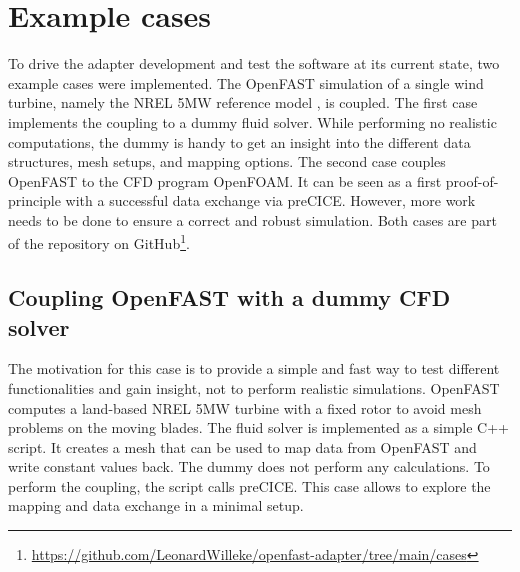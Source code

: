 \section{Example cases}
\label{section:cases}

To drive the adapter development and test the software at its current state, two example cases were implemented. The OpenFAST simulation of a single wind turbine, namely the NREL 5MW reference model \cite{Jonkman:2009}, is coupled. The first case implements the coupling to a dummy fluid solver. While performing no realistic computations, the dummy is handy to get an insight into the different data structures, mesh setups, and mapping options. The second case couples OpenFAST to the CFD program OpenFOAM. It can be seen as a first proof-of-principle with a successful data exchange via preCICE. However, more work needs to be done to ensure a correct and robust simulation. Both cases are part of the repository on GitHub\footnote{\url{https://github.com/LeonardWilleke/openfast-adapter/tree/main/cases}}.

\subsection{Coupling OpenFAST with a dummy CFD solver}
\label{section:cases:dummy}

The motivation for this case is to provide a simple and fast way to test different functionalities and gain insight, not to perform realistic simulations. OpenFAST computes a land-based NREL 5MW turbine with a fixed rotor to avoid mesh problems on the moving blades. The fluid solver is implemented as a simple C++ script. It creates a mesh that can be used to map data from OpenFAST and write constant values back. The dummy does not perform any calculations. To perform the coupling, the script calls preCICE. This case allows to explore the mapping and data exchange in a minimal setup.


